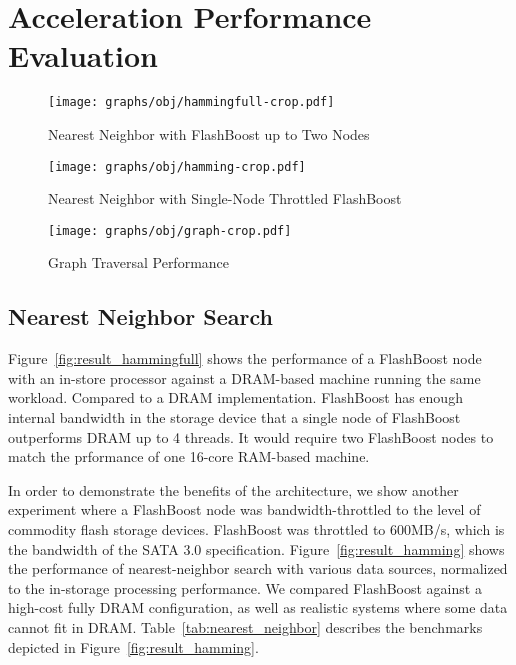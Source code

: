 \section{Acceleration Performance Evaluation}
\label{sec:results_acceleration}

\begin{figure*}[ht]
\centering
\vspace{0pt}
\begin{minipage}[c]{.3\textwidth}
	\texttt{[image: graphs/obj/hammingfull-crop.pdf]}
	\caption{Nearest Neighbor with FlashBoost up to Two Nodes}
	\label{fig:result_hammingfull}
\end{minipage}\hfill
\vspace{0pt}
\begin{minipage}[c]{.3\textwidth}
	\texttt{[image: graphs/obj/hamming-crop.pdf]}
	\caption{Nearest Neighbor with Single-Node Throttled FlashBoost}
	\label{fig:result_hamming}
\end{minipage}\hfill
\vspace{0pt}
\begin{minipage}[c]{.3\textwidth}
	\texttt{[image: graphs/obj/graph-crop.pdf]}
	\caption{Graph Traversal Performance}
	\label{fig:result_graph}
\end{minipage}
\end{figure*}

\subsection{Nearest Neighbor Search}

Figure~\ref{fig:result_hammingfull} shows the performance of a FlashBoost node
with an in-store processor against a DRAM-based machine running the same
workload. Compared to a DRAM implementation. FlashBoost has enough internal
bandwidth in the storage device that a single node of FlashBoost
outperforms DRAM up to 4 threads. It would require two FlashBoost nodes to match
the prformance of one 16-core RAM-based machine.

In order to demonstrate the benefits of the architecture, we show another
experiment where a FlashBoost node was bandwidth-throttled to the level of
commodity flash storage devices. FlashBoost was throttled to 600MB/s, which is
the bandwidth of the SATA 3.0 specification.
Figure~\ref{fig:result_hamming} shows the performance of nearest-neighbor search
with various data sources, normalized to the in-storage processing performance.
We compared FlashBoost against a high-cost fully DRAM configuration, as well as
realistic systems where some data cannot fit in DRAM.
Table~\ref{tab:nearest_neighbor} describes the benchmarks depicted in
Figure~\ref{fig:result_hamming}.

